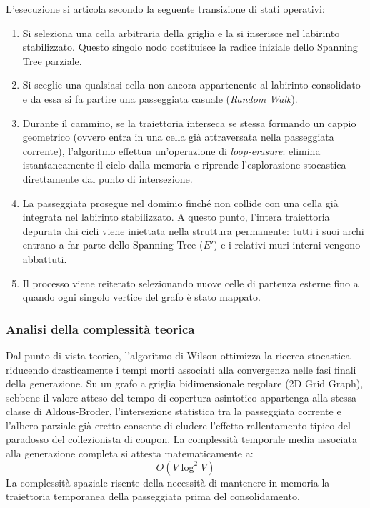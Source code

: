 \documentclass[12pt, a4paper]{article}
\begin{document}
	L'esecuzione si articola secondo la seguente transizione di stati operativi:
	\begin{enumerate}
		\item Si seleziona una cella arbitraria della griglia e la si inserisce nel labirinto stabilizzato. Questo singolo nodo costituisce la radice iniziale dello Spanning Tree parziale.
		\item Si sceglie una qualsiasi cella non ancora appartenente al labirinto consolidato e da essa si fa partire una passeggiata casuale (\textit{Random Walk}).
		\item Durante il cammino, se la traiettoria interseca se stessa formando un cappio geometrico (ovvero entra in una cella già attraversata nella passeggiata corrente), l'algoritmo effettua un'operazione di \textit{loop-erasure}: elimina istantaneamente il ciclo dalla memoria e riprende l'esplorazione stocastica direttamente dal punto di intersezione.
		\item La passeggiata prosegue nel dominio finché non collide con una cella già integrata nel labirinto stabilizzato. A questo punto, l'intera traiettoria depurata dai cicli viene iniettata nella struttura permanente: tutti i suoi archi entrano a far parte dello Spanning Tree ($E'$) e i relativi muri interni vengono abbattuti.
		\item Il processo viene reiterato selezionando nuove celle di partenza esterne fino a quando ogni singolo vertice del grafo è stato mappato.
	\end{enumerate}
	
	\subsubsection{Analisi della complessità teorica}
	Dal punto di vista teorico, l'algoritmo di Wilson ottimizza la ricerca stocastica riducendo drasticamente i tempi morti associati alla convergenza nelle fasi finali della generazione. Su un grafo a griglia bidimensionale regolare (2D Grid Graph), sebbene il valore atteso del tempo di copertura asintotico appartenga alla stessa classe di Aldous-Broder, l'intersezione statistica tra la passeggiata corrente e l'albero parziale già eretto consente di eludere l'effetto rallentamento tipico del paradosso del collezionista di coupon. La complessità temporale media associata alla generazione completa si attesta matematicamente a:
	$$O(V \log^2 V)$$
	La complessità spaziale risente della necessità di mantenere in memoria la traiettoria temporanea della passeggiata prima del consolidamento.
	
\end{document}
